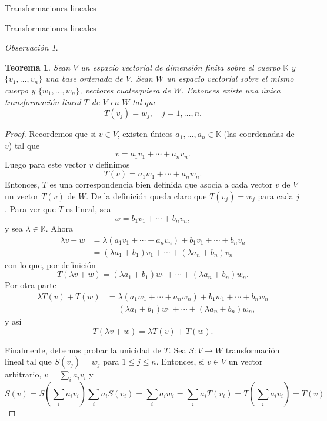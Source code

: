 \documentclass[a4paper,12pt,twoside,spanish,reqno]{amsbook}
\newtheorem{teorema}{Teorema}[section]
\theoremstyle{definition}
\theoremstyle{remark}
\newtheorem{obs}{Observaci\'on}[section]
\newcommand{\K}{\mathbb K}
\begin{document}
\begin{chapter}{Transformaciones lineales}
\begin{section}{Transformaciones lineales}
\begin{obs}
		\end{obs}
		
		
		\begin{teorema}\label{th-tl-definida-en-base}
			Sean $V$ un espacio vectorial de dimensión finita sobre el cuerpo $\K$ y $\{v_1,\ldots,v_n\}$  una base ordenada de $V$. Sean $W$ un espacio vectorial sobre el mismo cuerpo y $\{w_1,\ldots,w_n\}$, vectores cualesquiera de $W$. Entonces existe una única transformación  lineal $T$ de $V$ en $W$ tal que
			\begin{equation*}
			T(v_j) = w_j, \quad j=1,\ldots,n.
			\end{equation*}
		\end{teorema}
			\begin{proof}
				Recordemos que si $v \in V$,  existen únicos $a_1,\ldots,a_n \in \K$ (las coordenadas de $v$) tal que $$v = a_1v_1 + \cdots+a_n v_n.$$  Luego para este vector $v$  definimos
				\begin{equation*}
					T(v) = a_1w_1 + \cdots+a_n w_n.
				\end{equation*}
				Entonces, $T$ es una correspondencia bien definida que asocia a cada vector $v$ 
				de $V$ un vector $T(v)$ de $W$. De la definición queda claro que $T(v_j) = w_j$ para cada $j$. Para ver que $T$ es lineal, sea
				\begin{equation*}
					w = b_1v_1 + \cdots+b_n v_n,
				\end{equation*}
				y sea  $\lambda \in \K$. Ahora
				\begin{align*}
					\lambda v+w &= \lambda(a_1v_1 + \cdots+a_n v_n) + b_1v_1 + \cdots+b_n v_n \\
					&= (\lambda a_1+b_1)v_1 + \cdots+(\lambda a_n+b_n)v_n
				\end{align*}
				con lo que, por definición
				\begin{equation*}
					T(\lambda v+w) =(\lambda a_1+b_1)w_1 + \cdots+(\lambda a_n+b_n)w_n. 
				\end{equation*}
				Por otra parte
				\begin{align*}
				\lambda  T(v) + T(w) &= \lambda (a_1w_1 + \cdots+a_n w_n)+b_1w_1 + \cdots+b_n w_n	 \\
				 &=(\lambda a_1+b_1)w_1 + \cdots+(\lambda a_n+b_n)w_n ,			
				\end{align*}
				y así
				\begin{equation*}
					T(\lambda v+w) = 	\lambda  T(v) + T(w).
				\end{equation*}
				
				Finalmente,  debemos probar la unicidad de $T$. Sea $S: V \to W$ transformación lineal tal que $S(v_j) = w_j$ para $1 \le j \le n$. Entonces,  si $v \in V$ un vector arbitrario, $v = \sum_i a_i v_i$ y
				\begin{equation*}
					S(v) = S(\sum_i a_i v_i)\sum_i a_i S( v_i) = \sum_i a_iw_i = 
					 \sum_i a_i T( v_i) =  T(\sum_i a_i v_i) = T(v)
				\end{equation*}
			\end{proof}
		

\end{section}
\end{chapter}
\end{document}
